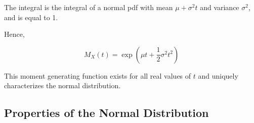 \documentclass[twoside]{book}
\begin{document}
The integral is the integral of a normal pdf with mean \(\mu + \sigma^2 t\) and variance \(\sigma^2\), and is equal to 1.

Hence,

\begin{textbox}
\[
M_X(t) = \exp\left(\mu t + \frac{1}{2} \sigma^2 t^2 \right)
\]
\end{textbox}

This moment generating function exists for all real values of \(t\) and uniquely characterizes the normal distribution.



\subsection{Properties of the Normal Distribution}
\end{document}
